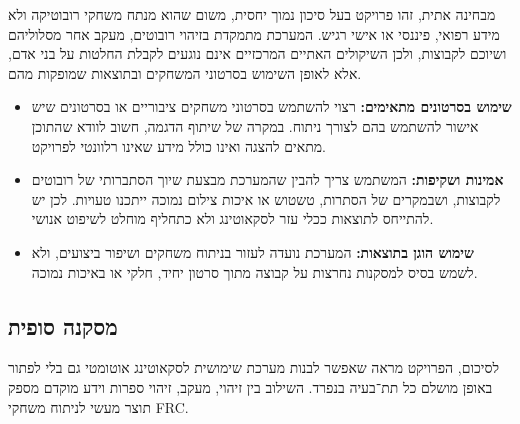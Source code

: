 מבחינה אתית, זהו פרויקט בעל סיכון נמוך יחסית, משום שהוא מנתח משחקי
רובוטיקה ולא מידע רפואי, פיננסי או אישי רגיש. המערכת מתמקדת בזיהוי
רובוטים, מעקב אחר מסלוליהם ושיוכם לקבוצות, ולכן השיקולים האתיים
המרכזיים אינם נוגעים לקבלת החלטות על בני אדם, אלא לאופן השימוש בסרטוני
המשחקים ובתוצאות שמופקות מהם.

\begin{itemize}
\item \textbf{שימוש בסרטונים מתאימים:} רצוי להשתמש בסרטוני משחקים
  ציבוריים או בסרטונים שיש אישור להשתמש בהם לצורך ניתוח. במקרה של שיתוף
  הדגמה, חשוב לוודא שהתוכן מתאים להצגה ואינו כולל מידע שאינו רלוונטי
  לפרויקט.

\item \textbf{אמינות ושקיפות:} המשתמש צריך להבין שהמערכת מבצעת שיוך
  הסתברותי של רובוטים לקבוצות, ושבמקרים של הסתרות, טשטוש או איכות צילום
  נמוכה ייתכנו טעויות. לכן יש להתייחס לתוצאות ככלי עזר לסקאוטינג ולא
  כתחליף מוחלט לשיפוט אנושי.

\item \textbf{שימוש הוגן בתוצאות:} המערכת נועדה לעזור בניתוח משחקים
  ושיפור ביצועים, ולא לשמש בסיס למסקנות נחרצות על קבוצה מתוך סרטון יחיד,
  חלקי או באיכות נמוכה.
\end{itemize}

\subsection{מסקנה סופית}

לסיכום, הפרויקט מראה שאפשר לבנות מערכת שימושית לסקאוטינג אוטומטי גם
בלי לפתור באופן מושלם כל תת־בעיה בנפרד. השילוב בין זיהוי, מעקב, זיהוי
ספרות וידע מוקדם מספק תוצר מעשי לניתוח משחקי \textenglish{FRC}.
